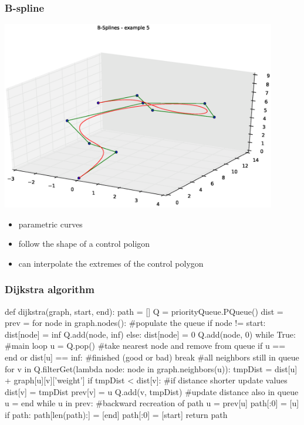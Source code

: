 \begin{frame}
  \frametitle{B-spline}
  \begin{center}
    \includegraphics[width=0.9\textwidth]{img/bspline.eps}
  \end{center}
  \pause
  \begin{itemize}
  \item \alert{parametric} curves\pause
  \item follow the shape of a \alert{control poligon}\pause
  \item can interpolate the
    \alert{extremes} of the control polygon
  \end{itemize}
\end{frame}

\begin{frame}[fragile]
  \frametitle{Dijkstra algorithm}
  \begin{pblock}
def dijkstra(graph, start, end):
  path = []
  Q = priorityQueue.PQueue()
  dist = {}
  prev = {}
  for node in graph.nodes(): #populate the queue
    if node != start:
      dist[node] = inf
      Q.add(node, inf)
    else:
      dist[node] = 0
      Q.add(node, 0)
  while True:  #main loop
    u = Q.pop() #take nearest node and remove from queue
    if u == end or dist[u] == inf: #finished (good or bad)
      break
    #all neighbors still in queue
    for v in Q.filterGet(lambda node: node in graph.neighbors(u)):
      tmpDist = dist[u] + graph[u][v]['weight']
      if tmpDist < dist[v]: #if distance shorter update values
        dist[v] = tmpDist
        prev[v] = u
        Q.add(v, tmpDist) #update distance also in queue
  u = end
  while u in prev:  #backward recreation of path
      u = prev[u]
      path[:0] = [u]
  if path:
      path[len(path):] = [end]
      path[:0] = [start]
  return path
  \end{pblock}  
\end{frame}


